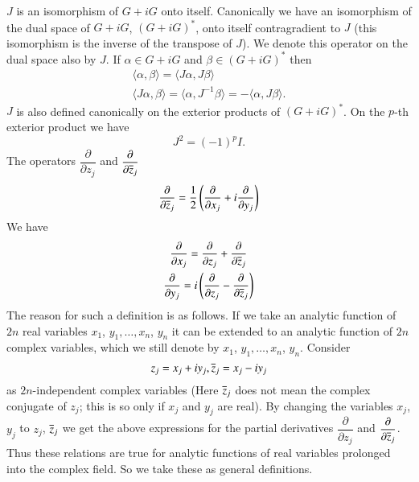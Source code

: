 $J$ is an isomorphism of $G+iG$ onto itself. Canonically we have an
isomorphism of the dual space of $G+iG$, $(G+iG)^{\ast}$, onto itself
contragradient to $J$ (this isomorphism is the inverse of the
transpose of $J$). We denote this operator on the dual space also by
$J$. If $\alpha\in G+iG$ and $\beta\in (G+iG)^{\ast}$ then
\begin{gather*}
\langle\alpha,\beta\rangle=\langle J\alpha, J\beta\rangle\\
\langle J\alpha,\beta\rangle=\langle\alpha,J^{-1}\beta\rangle=-\langle
\alpha,J\beta\rangle. 
\end{gather*}
$J$ is also defined canonically on the exterior products of
$(G+iG)^{\ast}$. On the $p$-th exterior product we have
$$
J^{2}=(-1)^{p}I.
$$
The operators $\dfrac{\partial}{\partial z_{j}}$ and
$\dfrac{\partial}{\partial\overline{z}_{j}}$ 
$$
\frac{\partial}{\partial
  \overline{z}_{j}}=\frac{1}{2}\left(\frac{\partial}{\partial
  x_{j}}+i\frac{\partial}{\partial y_{j}}\right) 
$$\pageoriginale 
We have
\begin{gather*}
\frac{\partial}{\partial x_{j}}=\frac{\partial}{\partial
  z_{j}}+\frac{\partial}{\partial \overline{z}_{j}}\\ 
\frac{\partial}{\partial y_{j}}=i\left(\frac{\partial}{\partial
  z_{j}}-\frac{\partial}{\partial \overline{z}_{j}}\right) 
\end{gather*}
The reason for such a definition is as follows. If we take an analytic
function of $2n$ real variables $x_{1}$, $y_{1},\ldots,x_{n}$, $y_{n}$
it can be extended to an analytic function of $2n$ complex variables,
which we still denote by $x_{1}$, $y_{1},\ldots,x_{n}$,
$y_{n}$. Consider
$$
z_{j}=x_{j}+iy_{j}, \overline{z}_{j}=x_{j}-iy_{j}
$$
as $2n$-independent complex variables (Here $\overline{z}_{j}$ does not mean
the complex conjugate of $z_{j}$; this is so only if $x_{j}$ and
$y_{j}$ are real). By changing the variables $x_{j}$, $y_{j}$ to
$z_{j}$, $\overline{z}_{j}$ we get the above expressions for the partial
derivatives $\dfrac{\partial}{\partial z_{j}}$ and
$\dfrac{\partial}{\partial \overline{z}_{j}}$. Thus these relations are true
for analytic functions of real variables prolonged into the complex
field. So we take these as general definitions.

